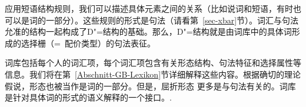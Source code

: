 应用短语结构规则，我们可以描述具体元素之间的关系（比如说词和短语，有时也可以是词的一部分）。这些规则的形式是\xbar 句法（请看第~\ref{sec-xbar}节）。词汇与\xbar 句法允准的结构一起构成了D"=结构的基础。那么，D"=结构就是由词库中的具体词形成的选择栅（=~配价类型）的句法表征。

词库包括每个人的词汇项，每个词汇项包含有关形态结构、句法特征和选择属性等信息。我们将在第~\ref{Abschnitt-GB-Lexikon}节详细解释这些内容。根据确切的理论假说，形态也被当作是词的一部分。但是，屈折形态 更多是与句法有关的。词库是针对具体词的形式的语义解释的一个接口。.

